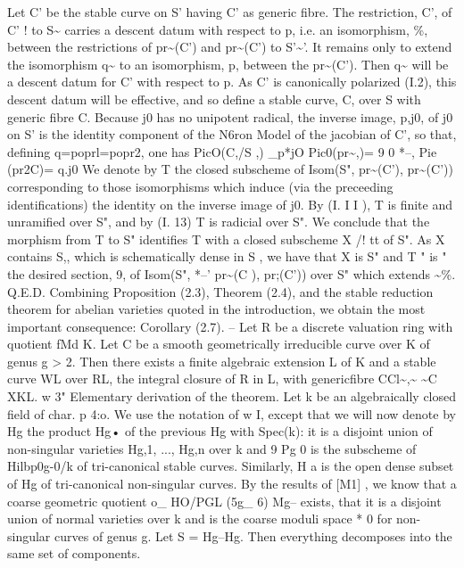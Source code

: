\documentclass[11pt]{article}
\theoremstyle{plain}
\theoremstyle{definition}
\theoremstyle{remark}
\begin{document}
Let C' be the stable curve on S' having C' as generic fibre. The restriction, C', of C' ! to S\textasciitilde{} carries a descent datum with respect to p, i.e. an isomorphism, \%, between the restrictions of pr\textasciitilde{}(C') and pr\textasciitilde{}(C') to S'\textasciitilde{}'. It remains only to extend the isomorphism q\textasciitilde{} to an isomorphism, p, between the pr\textasciitilde{}(C'). Then q\textasciitilde{} will be a descent datum for C' with respect to p. As C' is canonically polarized (I.2), this descent datum will be effective, and so define a stable curve, C, over S with generic fibre C. Because j0 has no unipotent radical, the inverse image, p,j0, of j0 on S' is the identity component of the N6ron Model of the jacobian of C', so that, defining q=poprl=popr2, one has PicO(C,/S ,) \_p*jO Pic0(pr\textasciitilde{},)= 9 0 *--, Pie (pr2C)= q.j0 We denote by T the closed subscheme of Isom(S", pr\textasciitilde{}(C'), pr\textasciitilde{}(C')) corresponding to those isomorphisms which induce (via the preceeding identifications) the identity on the inverse image of j0. By (I. I I ), T is finite and unramified over S", and by (I. 13) T is radicial over S". We conclude that the morphism from T to S" identifies T with a closed subscheme X /! tt of S". As X contains S,, which is schematically dense in S , we have that X is S" and T " is " the desired section, 9, of Isom(S", *--' pr\textasciitilde{}(C ), pr;(C')) over S" which extends \textasciitilde{}\%. Q.E.D. Combining Proposition (2.3), Theorem (2.4), and the stable reduction theorem for abelian varieties quoted in the introduction, we obtain the most important consequence: Corollary (2.7). -- Let R be a discrete valuation ring with quotient fMd K. Let C be a smooth geometrically irreducible curve over K of genus g > 2. Then there exists a finite algebraic extension L of K and a stable curve WL over RL, the integral closure of R in L, with genericfibre CCl\textasciitilde{},\textasciitilde{} \textasciitilde{}C XKL. w 3" Elementary derivation of the theorem. Let k be an algebraically closed field of char. p 4:o. We use the notation of w I, except that we will now denote by Hg the product Hg• of the previous Hg with Spec(k): it is a disjoint union of non-singular varieties Hg,1, ..., Hg,n over k and 9 Pg 0 is the subscheme of Hilbp0g-0/k of tri-canonical stable curves. Similarly, H a is the open dense subset of Hg of tri-canonical non-singular curves. By the results of [M1] , we know that a coarse geometric quotient o\_ HO/PGL (5g\_ 6) Mg-- exists, that it is a disjoint union of normal varieties over k and is the coarse moduli space * 0 for non-singular curves of genus g. Let S = Hg--Hg. Then everything decomposes into the same set of components.
\end{document}

